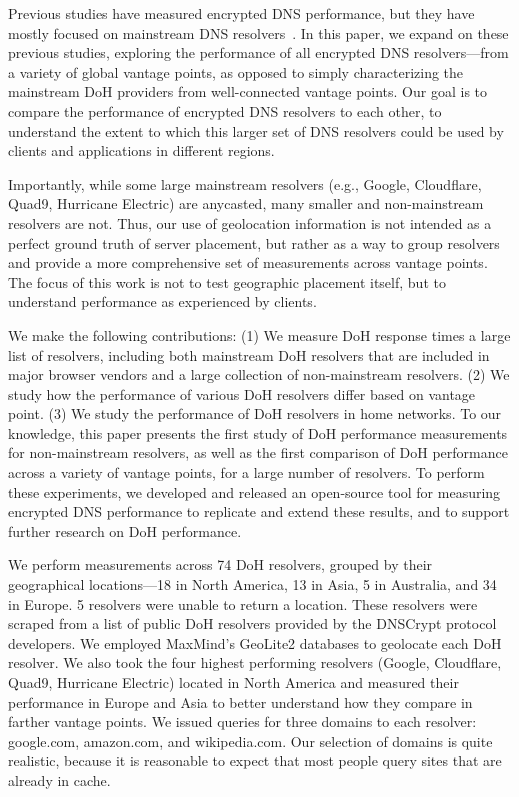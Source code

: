 Previous studies have measured encrypted DNS performance, but they have mostly focused on mainstream DNS resolvers~\cite{hounsel2020comparing,hounsel2021can,hoang2020k,lu2019end-to-end}.
In this paper, we expand on these previous studies, exploring the performance of all encrypted DNS resolvers—from a variety of global
vantage points, as opposed to simply characterizing the mainstream DoH providers from well-connected vantage points. Our goal is to compare the performance of encrypted DNS resolvers to each other, to understand the extent to which this larger set of DNS resolvers could be used by clients and applications in different regions. 

Importantly, while some large mainstream resolvers (e.g., Google, Cloudflare, Quad9, Hurricane Electric) are anycasted, many smaller and non-mainstream resolvers are not. Thus, our use of geolocation information is not intended as a perfect ground truth of server placement, but rather as a way to group resolvers and provide a more comprehensive set of measurements across vantage points. The focus of this work is not to test geographic placement itself, but to understand performance as experienced by clients.

We make the following contributions: (1) We measure DoH response times a large list of resolvers, including both mainstream DoH resolvers that are included in major browser vendors and a large collection of non-mainstream resolvers. (2) We study how the performance of various DoH resolvers differ based on vantage point. (3) We study the performance of DoH resolvers in home networks. To our knowledge, this paper presents the first study of DoH performance measurements for non-mainstream resolvers, as well as the first comparison of DoH performance across a variety of vantage points, for a large number of resolvers. To perform these experiments, we developed and released an open-source tool for measuring encrypted DNS performance to replicate and extend these results, and to support further research on DoH performance.

We perform measurements across 74 DoH resolvers, grouped by their geographical locations—18 in North America, 13 in Asia, 5 in Australia, and 34 in Europe. 5 resolvers were unable to return a location. These resolvers were scraped from a list of public DoH resolvers provided by the DNSCrypt protocol developers. We employed MaxMind’s GeoLite2 databases to geolocate each DoH resolver. We also took the four highest performing resolvers (Google, Cloudflare, Quad9, Hurricane Electric) located in North America and measured their performance in Europe and Asia to better understand how they compare in farther vantage points. We issued queries for three domains to each resolver: google.com, amazon.com, and wikipedia.com. Our selection of domains is quite realistic, because it is reasonable to expect that most people query sites that are already in cache. 

